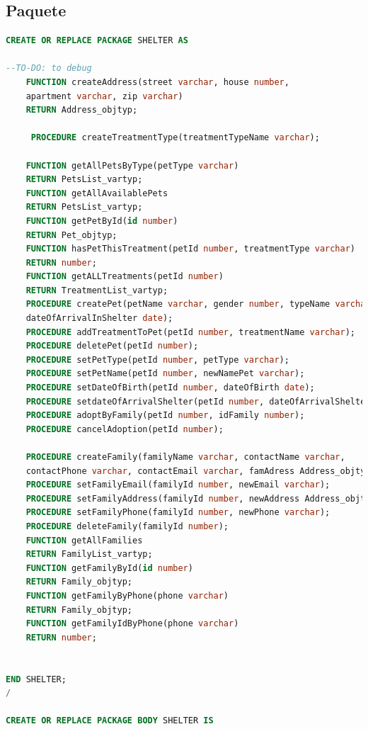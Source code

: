\documentclass{FR16}
\begin{document}
\subsection{Paquete}
\begin{lstlisting}[language=Sql, basicstyle=\scriptsize]
CREATE OR REPLACE PACKAGE SHELTER AS

--TO-DO: to debug
    FUNCTION createAddress(street varchar, house number, 
    apartment varchar, zip varchar)      
    RETURN Address_objtyp;
    
     PROCEDURE createTreatmentType(treatmentTypeName varchar);

    FUNCTION getAllPetsByType(petType varchar)              
    RETURN PetsList_vartyp;
    FUNCTION getAllAvailablePets                            
    RETURN PetsList_vartyp;
    FUNCTION getPetById(id number)                          
    RETURN Pet_objtyp;
    FUNCTION hasPetThisTreatment(petId number, treatmentType varchar)
    RETURN number;
    FUNCTION getALLTreatments(petId number)                              
    RETURN TreatmentList_vartyp;
    PROCEDURE createPet(petName varchar, gender number, typeName varchar, 
    dateOfArrivalInShelter date);
    PROCEDURE addTreatmentToPet(petId number, treatmentName varchar);
    PROCEDURE deletePet(petId number); 
    PROCEDURE setPetType(petId number, petType varchar);
    PROCEDURE setPetName(petId number, newNamePet varchar);
    PROCEDURE setDateOfBirth(petId number, dateOfBirth date);
    PROCEDURE setdateOfArrivalShelter(petId number, dateOfArrivalShelter date);
    PROCEDURE adoptByFamily(petId number, idFamily number);
    PROCEDURE cancelAdoption(petId number);

    PROCEDURE createFamily(familyName varchar, contactName varchar, 
    contactPhone varchar, contactEmail varchar, famAdress Address_objtyp);
    PROCEDURE setFamilyEmail(familyId number, newEmail varchar);
    PROCEDURE setFamilyAddress(familyId number, newAddress Address_objtyp);
    PROCEDURE setFamilyPhone(familyId number, newPhone varchar);
    PROCEDURE deleteFamily(familyId number);
    FUNCTION getAllFamilies                                    
    RETURN FamilyList_vartyp;
    FUNCTION getFamilyById(id number)                         
    RETURN Family_objtyp;
    FUNCTION getFamilyByPhone(phone varchar)                  
    RETURN Family_objtyp;
    FUNCTION getFamilyIdByPhone(phone varchar)                 
    RETURN number;
    

END SHELTER;
/

CREATE OR REPLACE PACKAGE BODY SHELTER IS


\end{lstlisting}
\end{document}
